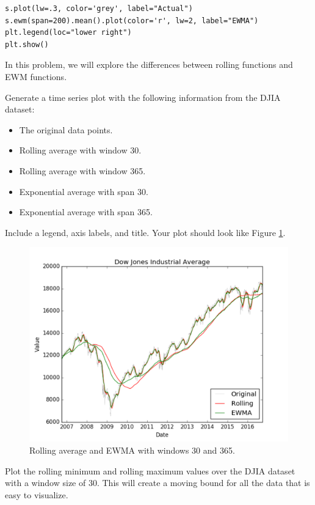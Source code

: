 \begin{lstlisting}
s.plot(lw=.3, color='grey', label="Actual")
s.ewm(span=200).mean().plot(color='r', lw=2, label="EWMA")
plt.legend(loc="lower right")
plt.show()
\end{lstlisting}

\begin{problem} \label{prob:averages}
In this problem, we will explore the differences between rolling functions and EWM functions.

Generate a time series plot with the following information from the DJIA dataset:
    \begin{itemize}
        \item The original data points.
        \item Rolling average with window 30.
        \item Rolling average with window 365.
        \item Exponential average with span 30.
        \item Exponential average with span 365.
    \end{itemize}
Include a legend, axis labels, and title. Your plot should look like Figure \ref{fig:averages}.
\end{problem}

\begin{figure} \label{fig:averages}
    \includegraphics[width=\textwidth]{dow_averages.pdf}
    \caption{Rolling average and EWMA with windows 30 and 365.}
\end{figure}

\begin{problem} \label{prob:rolling_bound}
Plot the rolling minimum and rolling maximum values over the DJIA dataset with a window size of 30. This will create a moving bound for all the data that is easy to visualize.
\end{problem}
